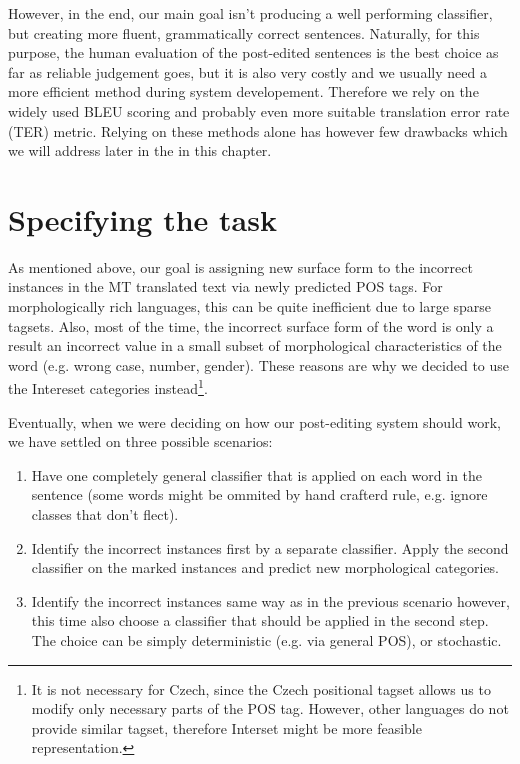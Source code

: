 However, in the end, our main goal isn't producing a well performing classifier, but creating
more fluent, grammatically correct sentences.
Naturally, for this purpose, the human evaluation of the post-edited sentences is the best choice as far
as reliable judgement goes, but it is also very costly and we usually need a more efficient
method during system developement. Therefore we rely on the widely used BLEU scoring and
probably even more suitable translation error rate (TER) metric. Relying on these methods alone
has however few drawbacks which we will address later in the in this chapter.

\section{Specifying the task}

As mentioned above, our goal is assigning new surface form to the incorrect instances
in the MT translated text via newly predicted POS tags. For morphologically rich languages,
this can be quite inefficient due to large sparse tagsets. Also, most of the time,
the incorrect surface form of the word is only a result an incorrect value in a small
subset of morphological characteristics of the word (e.g. wrong case, number, gender).
These reasons are why we decided to use the Intereset categories instead\footnote{It is
not necessary for Czech, since the Czech positional tagset allows us to modify only necessary
parts of the POS tag. However, other languages do not provide similar tagset, therefore
Interset might be more feasible representation.}.

Eventually, when we were deciding on how our post-editing system should work, we have settled on three possible scenarios:
\begin{enumerate}
    \item Have one completely general classifier that is applied on each word in the sentence (some
        words might be ommited by hand crafterd rule, e.g. ignore classes that don't flect).
    \item Identify the incorrect instances first by a separate classifier. Apply the second classifier
        on the marked instances and predict new morphological categories.
    \item Identify the incorrect instances same way as in the previous scenario however, this time also choose a classifier that
        should be applied in the second step. The choice can be simply deterministic (e.g. via general POS), or stochastic.
\end{enumerate}

